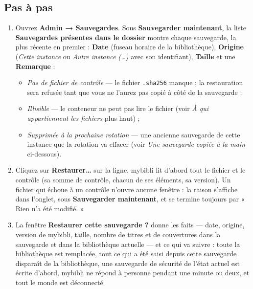 \subsection*{Pas à pas}

\begin{enumerate}
  \item Ouvrez \textbf{Admin → Sauvegardes}. Sous \textbf{Sauvegarder
        maintenant}, la liste \textbf{Sauvegardes présentes dans le
        dossier} montre chaque sauvegarde, la plus récente en premier :
        \textbf{Date} (fuseau horaire de la bibliothèque),
        \textbf{Origine} (\emph{Cette instance} ou \emph{Autre instance
        (\dots)} avec son identifiant), \textbf{Taille} et une
        \textbf{Remarque} :
        \begin{itemize}
          \item \emph{Pas de fichier de contrôle} --- le fichier
                \texttt{.sha256} manque ; la restauration sera refusée
                tant que vous ne l'aurez pas copié à côté de la
                sauvegarde ;
          \item \emph{Illisible} --- le conteneur ne peut pas lire le
                fichier (voir \emph{À qui appartiennent les fichiers}
                plus haut) ;
          \item \emph{Supprimée à la prochaine rotation} --- une
                ancienne sauvegarde de cette instance que la rotation
                va effacer (voir \emph{Une sauvegarde copiée à la main}
                ci-dessous).
        \end{itemize}
  \item Cliquez sur \textbf{Restaurer…} sur la ligne. mybibli lit
        d'abord tout le fichier et le contrôle (sa somme de contrôle,
        chacun de ses éléments, sa version). Un fichier qui échoue à un
        contrôle n'ouvre aucune fenêtre : la raison s'affiche dans
        l'onglet, sous \textbf{Sauvegarder maintenant}, et se termine
        toujours par « Rien n'a été modifié. »
  \item La fenêtre \textbf{Restaurer cette sauvegarde ?} donne les faits
        --- date, origine, version de mybibli, taille, nombre de titres
        et de couvertures dans la sauvegarde et dans la bibliothèque
        actuelle --- et ce qui va suivre : toute la bibliothèque est
        remplacée, tout ce qui a été saisi depuis cette sauvegarde
        disparaît de la bibliothèque, une sauvegarde de sécurité de
        l'état actuel est écrite d'abord, mybibli ne répond à personne
        pendant une minute ou deux, et tout le monde est déconnecté

\end{enumerate}
